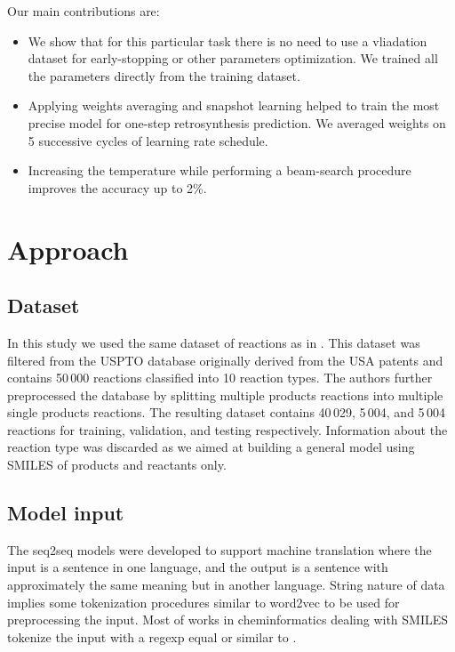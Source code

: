 \documentclass{article}
\begin{document}
Our main contributions are:
\begin{itemize}
\item We show that for this particular task there is no need to use a vliadation dataset for early-stopping or other parameters optimization. We trained all the parameters directly from the training dataset.
\item Applying weights averaging and snapshot learning helped to train the most precise model for one-step retrosynthesis prediction. We averaged weights on 5 successive cycles of learning rate schedule.
\item Increasing the temperature while performing a beam-search procedure improves the accuracy up to 2\%. 
\end{itemize}

\section{Approach}
\label{sec:approach}

\subsection{Dataset}

In this study we used the same dataset of reactions as in \cite{Pande}. 
This dataset was filtered from the USPTO database\cite{Lowe} originally derived from the USA patents and 
contains 50\,000 reactions classified into 10 reaction types\cite{Schneider}. The authors\cite{Pande} further preprocessed the database by 
splitting multiple products reactions into multiple single products reactions. The resulting dataset contains 40\,029, 5\,004, and 5\,004 reactions for training, validation, and testing respectively. Information about the reaction type 
was discarded as we aimed at building a general model using SMILES of products and reactants only.


\subsection{Model input}
The seq2seq models were developed to support machine translation where the input is a sentence in one language, and the output is a sentence with approximately the same meaning but in another language. String nature of data implies some tokenization procedures similar to word2vec to be used for preprocessing the input. Most of works in cheminformatics dealing with SMILES tokenize the input with a regexp equal or similar to \cite{SchwallerTranslation}. 
\end{document}
